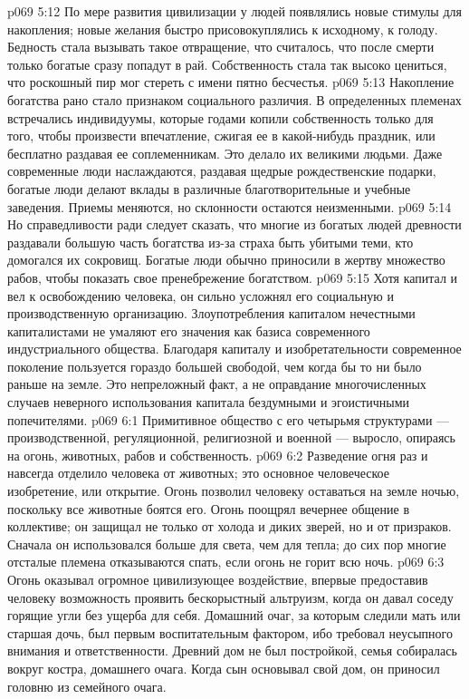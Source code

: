 \vs p069 5:12 \pc По мере развития цивилизации у людей появлялись новые стимулы для накопления; новые желания быстро присовокуплялись к исходному, к голоду. Бедность стала вызывать такое отвращение, что считалось, что после смерти только богатые сразу попадут в рай. Собственность стала так высоко цениться, что роскошный пир мог стереть с имени пятно бесчестья.
\vs p069 5:13 Накопление богатства рано стало признаком социального различия. В определенных племенах встречались индивидуумы, которые годами копили собственность только для того, чтобы произвести впечатление, сжигая ее в какой\hyp{}нибудь праздник, или бесплатно раздавая ее соплеменникам. Это делало их великими людьми. Даже современные люди наслаждаются, раздавая щедрые рождественские подарки, богатые люди делают вклады в различные благотворительные и учебные заведения. Приемы меняются, но склонности остаются неизменными.
\vs p069 5:14 Но справедливости ради следует сказать, что многие из богатых людей древности раздавали большую часть богатства из\hyp{}за страха быть убитыми теми, кто домогался их сокровищ. Богатые люди обычно приносили в жертву множество рабов, чтобы показать свое пренебрежение богатством.
\vs p069 5:15 Хотя капитал и вел к освобождению человека, он сильно усложнял его социальную и производственную организацию. Злоупотребления капиталом нечестными капиталистами не умаляют его значения как базиса современного индустриального общества. Благодаря капиталу и изобретательности современное поколение пользуется гораздо большей свободой, чем когда бы то ни было раньше на земле. Это непреложный факт, а не оправдание многочисленных случаев неверного использования капитала бездумными и эгоистичными попечителями.
\vs p069 6:1 Примитивное общество с его четырьмя структурами --- производственной, регуляционной, религиозной и военной --- выросло, опираясь на огонь, животных, рабов и собственность.
\vs p069 6:2 Разведение огня раз и навсегда отделило человека от животных; это основное человеческое изобретение, или открытие. Огонь позволил человеку оставаться на земле ночью, поскольку все животные боятся его. Огонь поощрял вечернее общение в коллективе; он защищал не только от холода и диких зверей, но и от призраков. Сначала он использовался больше для света, чем для тепла; до сих пор многие отсталые племена отказываются спать, если огонь не горит всю ночь.
\vs p069 6:3 Огонь оказывал огромное цивилизующее воздействие, впервые предоставив человеку возможность проявить бескорыстный альтруизм, когда он давал соседу горящие угли без ущерба для себя. Домашний очаг, за которым следили мать или старшая дочь, был первым воспитательным фактором, ибо требовал неусыпного внимания и ответственности. Древний дом не был постройкой, семья собиралась вокруг костра, домашнего очага. Когда сын основывал свой дом, он приносил головню из семейного очага.
